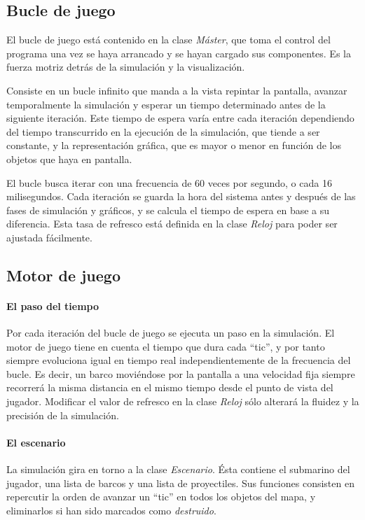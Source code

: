 \documentclass[a4paper,
	11pt,
	parskip=full,
	bibliography=totoc,
	twoside
	]{scrartcl}
\begin{document}
	\subsection{Bucle de juego}
	\label{subsec:bucle_juego}
		El bucle de juego está contenido en la clase \textit{Máster}, que toma el control del programa una vez se haya arrancado y se hayan cargado sus componentes. Es la fuerza motriz detrás de la simulación y la visualización. \cite{dewitters_game_loop, so_game_loop}
		
		Consiste en un bucle infinito que manda a la vista repintar la pantalla, avanzar temporalmente la simulación y esperar un tiempo determinado antes de la siguiente iteración. Este tiempo de espera varía entre cada iteración dependiendo del tiempo transcurrido en la ejecución de la simulación, que tiende a ser constante, y la representación gráfica, que es mayor o menor en función de los objetos que haya en pantalla.
		
		El bucle busca iterar con una frecuencia de 60 veces por segundo, o cada 16 milisegundos. Cada iteración se guarda la hora del sistema antes y después de las fases de simulación y gráficos, y se calcula el tiempo de espera en base a su diferencia. Esta tasa de refresco está definida en la clase \textit{Reloj} para poder ser ajustada fácilmente.
	
	\subsection{Motor de juego}
	\label{subsec:motor_juego}
		\paragraph{El paso del tiempo}
			Por cada iteración del bucle de juego se ejecuta un paso en la simulación. El motor de juego tiene en cuenta el tiempo que dura cada ``tic'', y por tanto siempre evoluciona igual en tiempo real independientemente de la frecuencia del bucle. Es decir, un barco moviéndose por la pantalla a una velocidad fija siempre recorrerá la misma distancia en el mismo tiempo desde el punto de vista del jugador. Modificar el valor de refresco en la clase \textit{Reloj} sólo alterará la fluidez y la precisión de la simulación.
			
		\paragraph{El escenario}
			La simulación gira en torno a la clase \textit{Escenario}. Ésta contiene el submarino del jugador, una lista de barcos y una lista de proyectiles. Sus funciones consisten en repercutir la orden de avanzar un ``tic'' en todos los objetos del mapa, y eliminarlos si han sido marcados como \textit{destruido}.
		
\end{document}
